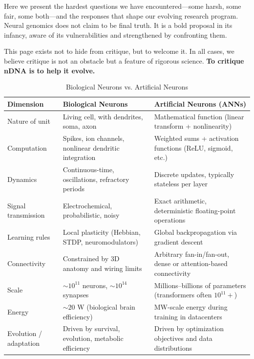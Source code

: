 \documentclass[11pt]{article}
\begin{document}
Here we present the hardest questions we have encountered---some harsh, some fair, some both---and the responses that shape our evolving research program. 
Neural genomics does not claim to be final truth. 
It is a bold proposal in its infancy, aware of its vulnerabilities and strengthened by confronting them. 

This page exists not to hide from critique, but to welcome it. 
In all cases, we believe critique is not an obstacle but a feature of rigorous science. 
\textbf{To critique nDNA is to help it evolve.}





\begin{table}[ht!]
\centering
\caption{Biological Neurons vs. Artificial Neurons}
\renewcommand{\arraystretch}{1.3}
\begin{tabularx}{\textwidth}{|>{\raggedright\arraybackslash}p{}|
                                >{\raggedright\arraybackslash}X|
                                >{\raggedright\arraybackslash}X|}
\hline
\textbf{Dimension} & \textbf{Biological Neurons} & \textbf{Artificial Neurons (ANNs)} \\
\hline
Nature of unit & Living cell, with dendrites, soma, axon & Mathematical function (linear transform + nonlinearity) \\
\hline
Computation & Spikes, ion channels, nonlinear dendritic integration & Weighted sums + activation functions (ReLU, sigmoid, etc.) \\
\hline
Dynamics & Continuous-time, oscillations, refractory periods & Discrete updates, typically stateless per layer \\
\hline
Signal transmission & Electrochemical, probabilistic, noisy & Exact arithmetic, deterministic floating-point operations \\
\hline
Learning rules & Local plasticity (Hebbian, STDP, neuromodulators) & Global backpropagation via gradient descent \\
\hline
Connectivity & Constrained by 3D anatomy and wiring limits & Arbitrary fan-in/fan-out, dense or attention-based connectivity \\
\hline
Scale & $\sim 10^{11}$ neurons, $\sim 10^{14}$ synapses & Millions–billions of parameters (transformers often $10^{11}+$) \\
\hline
Energy & $\sim 20$ W (biological brain efficiency) & MW-scale energy during training in datacenters \\
\hline
Evolution / adaptation & Driven by survival, evolution, metabolic efficiency & Driven by optimization objectives and data distributions \\

\end{tabularx}
\end{table}
\end{document}
